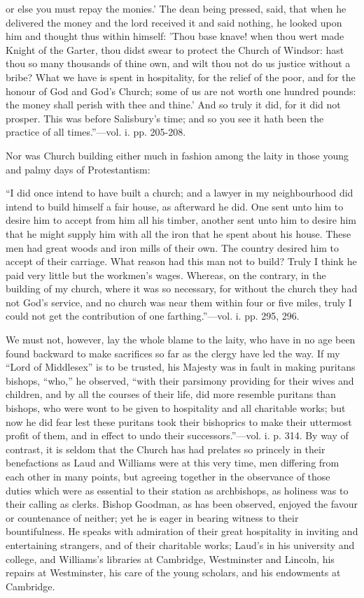 or else you must repay the monies.' The dean being pressed, said, that
when he delivered the money and the lord received it and said nothing,
he looked upon him and thought thus within himself: 'Thou base knave!
when thou wert made Knight of the Garter, thou didst swear to protect
the Church of Windsor: hast thou so many thousands of thine own, and
wilt thou not do us justice without a bribe? What we have is spent in
hospitality, for the relief of the poor, and
for the honour of God and God's Church; some of us are not worth one
hundred pounds: the money shall perish with thee and thine.' And so
truly it did, for it did not prosper. This was before Salisbury's time;
and so you see it hath been the practice of all times.''—vol. i. pp.
205-208.

Nor was Church building either much in fashion
among the laity in those young and palmy days of Protestantism:

``I did once intend to have built a
church; and a lawyer in my neighbourhood did intend to build himself a
fair house, as afterward he did. One sent unto him to desire him to
accept from him all his timber, another sent unto him to desire him that
he might supply him with all the iron that he spent about his house.
These men had great woods and iron mills of their own. The country
desired him to accept of their carriage. What reason had this man not to
build? Truly I think he paid very little but the workmen's wages.
Whereas, on the contrary, in the building of my church, where it was so
necessary, for without the church they had not God's service, and no
church was near them within four or five miles, truly I could not get
the contribution of one farthing.''—vol. i. pp. 295, 296.

We must not, however, lay the whole blame to the
laity, who have in no age been found backward to make sacrifices so far
as the clergy have led the way. If my ``Lord of Middlesex'' is to be
trusted, his Majesty was in fault in making puritans bishops, ``who,'' he
observed, ``with their parsimony providing for their wives and children,
and by all the courses of their life, did more resemble puritans than
bishops, who were wont to be given to hospitality and all charitable
works; but now he did fear lest these puritans took their bishoprics to
make their uttermost profit of them, and in effect to undo their
successors.''—vol. i. p. 314. By way of contrast, it is seldom that the
Church has had prelates so princely in their benefactions as Laud and
Williams were at this very time, men differing from each other in many
points, but agreeing together in the observance of those duties which
were as essential to their station as archbishops, as holiness was to
their calling as clerks. Bishop Goodman, as has been observed, enjoyed
the favour or countenance of neither; yet he is eager in bearing witness
to their bountifulness. He speaks with admiration of their great
hospitality in inviting and entertaining strangers, and of their
charitable works; Laud's in his university and college, and Williams's
libraries at Cambridge, Westminster and Lincoln, his repairs at
Westminster, his care of the young scholars, and his endowments at
Cambridge.

